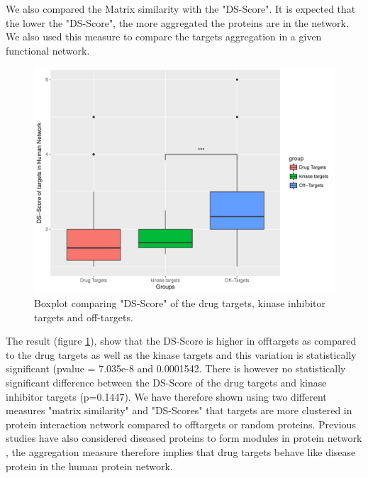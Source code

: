 \documentclass[a4paper, 11pt]{article}
\begin{document}
We also compared the Matrix similarity with the "DS-Score". It is expected that the lower the "DS-Score", the more aggregated the proteins are in the network. We also used this measure to compare the targets aggregation in a given functional network.
\begin{figure}[H]
	\includegraphics[width=\linewidth]{figures/dsboxplot.pdf}
	\centering
	\caption{Boxplot comparing "DS-Score" of the drug targets, kinase inhibitor targets and off-targets.}
		\label{ds_targets}
\end{figure}
The result (figure \ref{ds_targets}), show that the DS-Score is higher in offtargets as compared to the drug targets as well as the kinase targets and this variation is statistically significant (pvalue = 7.035e-8 and 0.0001542. There is however no statistically significant difference between the DS-Score of the drug targets and kinase inhibitor targets (p=0.1447). We have therefore shown using two different measures "matrix similarity" and "DS-Scores" that targets are more clustered in protein interaction network compared to offtargets or random proteins. Previous studies have also considered diseased proteins to form modules in protein network \cite{menche2015uncovering}, the aggregation measure therefore implies that drug targets behave like disease protein in the human protein network. 
\end{document}
